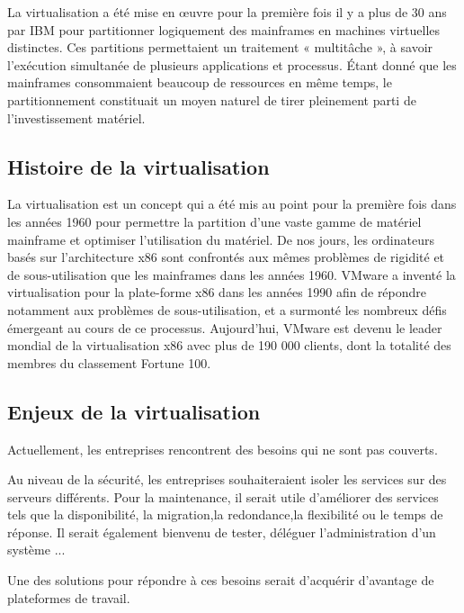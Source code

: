 La virtualisation a été mise en œuvre pour la première fois il y
a plus de 30 ans par IBM pour partitionner logiquement des mainframes
en machines virtuelles distinctes. Ces partitions permettaient un
traitement « multitâche », à savoir l'exécution simultanée de plusieurs applications et processus. Étant donné que les mainframes consommaient beaucoup de ressources en même temps, le partitionnement constituait un moyen naturel de tirer pleinement parti de l'investissement matériel.


\subsection{Histoire de la virtualisation}

La virtualisation est un concept qui a été mis au point pour la première fois dans les années 1960 pour permettre la partition d'une vaste gamme de matériel mainframe et optimiser l'utilisation du matériel. De nos jours, les ordinateurs basés sur l'architecture x86 sont confrontés aux mêmes problèmes de rigidité et de sous-utilisation que les mainframes dans les années 1960. VMware a inventé la virtualisation pour la plate-forme x86 dans les années 1990 afin de répondre notamment aux problèmes de sous-utilisation, et a surmonté les nombreux défis émergeant au cours de ce processus. Aujourd'hui, VMware est devenu le leader mondial de la virtualisation x86 avec plus de 190 000 clients, dont la totalité des membres du classement Fortune 100.

\subsection{Enjeux de la virtualisation}

Actuellement, les entreprises rencontrent des besoins qui ne sont
pas couverts.

Au niveau de la sécurité, les entreprises souhaiteraient isoler les
services sur des serveurs différents. Pour la maintenance, il serait
utile d'améliorer des services tels que la disponibilité, la migration,la redondance,la flexibilité ou le temps de réponse. Il serait également bienvenu de tester, déléguer l'administration d'un système ...


Une des solutions pour répondre à ces besoins serait d'acquérir d'avantage de plateformes de travail.


